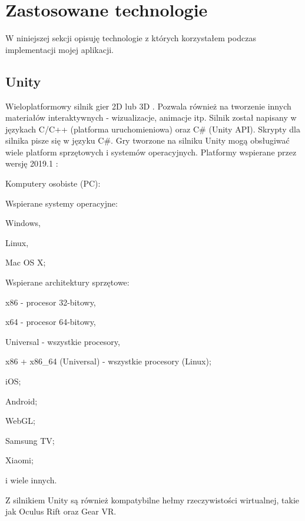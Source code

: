\section{Zastosowane technologie}
W niniejszej sekcji opisuję technologie z których korzystałem podczas implementacji mojej aplikacji.
\subsection{Unity}
Wieloplatformowy silnik gier 2D lub 3D \cite{unity:opis}. Pozwala również na tworzenie innych materiałów interaktywnych - wizualizacje, animacje itp. Silnik został napisany w językach C/C++ (platforma uruchomieniowa) oraz C\# (Unity API). Skrypty dla silnika pisze się w języku C\#. Gry tworzone na silniku Unity mogą obsługiwać wiele platform sprzętowych i systemów operacyjnych. 
Platformy wspierane przez wersję 2019.1 \cite{unity:buildOptions}:
\begin{enumerate*}
\item Komputery osobiste (PC):
\begin{enumerate*}
\item Wspierane systemy operacyjne:
\begin{itemize*}
\item Windows,
\item Linux,
\item Mac OS X;
\end{itemize*}
\item Wspierane architektury sprzętowe:
\begin{itemize*}
\item x86 - procesor 32-bitowy,
\item x64 - procesor 64-bitowy,
\item Universal - wszystkie procesory,
\item x86 + x86\_64 (Universal) - wszystkie procesory (Linux);
\end{itemize*}
\end{enumerate*}
\item iOS;
\item Android;
\item WebGL;
\item Samsung TV;
\item Xiaomi;
\item i wiele innych.
\end{enumerate*}

Z silnikiem Unity są również kompatybilne hełmy rzeczywistości wirtualnej, takie jak Oculus Rift oraz Gear VR.

